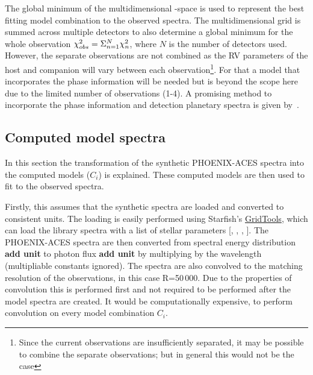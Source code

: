 The global minimum of the multidimensional \textchisquared-space is used to represent the best fitting model combination to the observed spectra.
The multidimensional \textchisquared{} grid is summed across multiple detectors to also determine a global minimum \textchisquared{} for the whole observation \({\chi}^{2}_{obs} = \Sigma^{N}_{n=1} {\chi}^{2}_n\), where \(N\) is the number of detectors used.
However, the separate observations are not combined as the {RV} parameters of the host and companion will vary between each observation\footnote{Since the current observations are insufficiently separated, it may be possible to combine the separate observations; but in general this would not be the case}.
For that a model that incorporates the phase information will be needed but is beyond the scope here due to the limited number of observations (1-4).
A promising method to incorporate the phase information and detection planetary spectra is given by~\citep{lockwood_nearir_2014,piskorz_evidence_2016}.



\subsection{Computed model spectra}
\label{models}
In this section the transformation of the synthetic {PHOENIX-ACES} spectra into the computed models (\(C_i\)) is explained.
These computed models are then used to fit to the observed spectra.

Firstly, this assumes that the synthetic spectra are loaded and converted to consistent units.
The loading is easily performed using Starfish's \href{https://iancze.github.io/Starfish/current/grid_tools.html}{GridTools}, which can load the library spectra with a list of stellar parameters [\Teff{}, \logg{}, \feh{}, \alphafe{}].
The {PHOENIX-ACES} spectra are then converted from spectral energy distribution  \textbf{add unit} to photon flux \textbf{add unit} by multiplying by the wavelength (multipliable constants ignored).
The spectra are also convolved to the matching resolution of the observations, in this case R=50\,000.
Due to the properties of convolution this is performed first and not required to be performed after the model spectra are created.
It would be computationally expensive, to perform convolution on every model combination \(C_i\).

